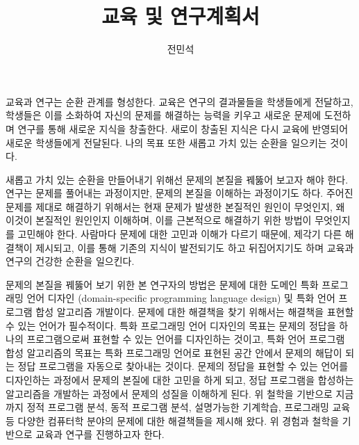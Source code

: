 \documentclass[11pt]{article}
\begin{document}
\title{교육 및 연구계획서}
 
\author{전민석}



\newcommand{\DisjunctiveModel}{\textsc{Disjunctive Model}}
\newcommand{\FeatureLanguage}{\textsc{Feature Language}}
\newcommand{\GDL}{\textsc{Graph Description Language}}
\newcommand{\PLXGL}{\textsc{PL4XGL}}


\newcommand{\AbstractRelativeWritePattern}{\textsc{Abstract Relative Write Pattern}}





\maketitle 
\begin{spacing}{1.145}

교육과 연구는 순환 관계를 형성한다. 
%
교육은 연구의 결과물들을 학생들에게 전달하고, 학생들은 이를 소화하여 자신의 문제를 해결하는 능력을 키우고 새로운 문제에 도전하며 연구를 통해 새로운 지식을 창출한다. 새로이 창출된 지식은 다시 교육에 반영되어 새로운 학생들에게 전달된다.
%
나의 목표 또한 새롭고 가치 있는 순환을 일으키는 것이다.



새롭고 가치 있는 순환을 만들어내기 위해선 문제의 본질을 꿰뚫어 보고자 해야 한다.
%
연구는 문제를 풀어내는 과정이지만, 문제의 본질을 이해하는 과정이기도 하다. 
%
주어진 문제를 제대로 해결하기 위해서는 현재 문제가 발생한 본질적인 원인이 무엇인지, 왜 이것이 본질적인 원인인지 이해하며, 이를 근본적으로 해결하기 위한 방법이 무엇인지를 고민해야 한다.
%
사람마다 문제에 대한 고민과 이해가 다르기 때문에, 제각기 다른 해결책이 제시되고, 이를 통해 기존의 지식이 발전되기도 하고 뒤집어지기도 하며 교육과 연구의 건강한 순환을 일으킨다.
%



문제의 본질을 꿰뚫어 보기 위한 본 연구자의 방법은 문제에 대한 도메인 특화 프로그래밍 언어 디자인 (domain-specific programming language design) 및 특화 언어 프로그램 합성 알고리즘 개발이다.
% 
문제에 대한 해결책을 찾기 위해서는 해결책을 표현할 수 있는 언어가 필수적이다.
% 
특화 프로그래밍 언어 디자인의 목표는 문제의 정답을 하나의 프로그램으로써 표현할 수 있는 언어를 디자인하는 것이고, 특화 언어 프로그램 합성 알고리즘의 목표는 특화 프로그래밍 언어로 표현된 공간 안에서 문제의 해답이 되는 정답 프로그램을 자동으로 찾아내는 것이다.
% 
문제의 정답을 표현할 수 있는 언어를 디자인하는 과정에서 문제의 본질에 대한 고민을 하게 되고, 정답 프로그램을 합성하는 알고리즘을 개발하는 과정에서 문제의 성질을 이해하게 된다.
%
위 철학을 기반으로 지금까지 정적 프로그램 분석, 동적 프로그램 분석, 설명가능한 기계학습, 프로그래밍 교육 등 다양한 컴퓨터학 분야의 문제에 대한 해결책들을 제시해 왔다.
%
위 경험과 철학을 기반으로 교육과 연구를 진행하고자 한다.
    







\end{spacing}
\end{document}
